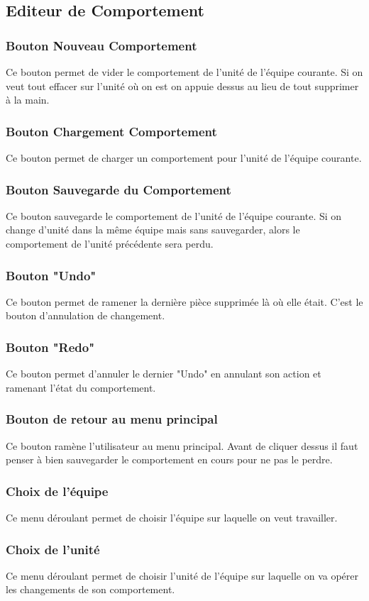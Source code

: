 \documentclass{report}
\begin{document}
\subsection{Editeur de Comportement}
\subsubsection{Bouton Nouveau Comportement}
Ce bouton permet de vider le comportement de l'unité de l'équipe courante. Si on veut tout effacer sur l'unité où on est on appuie dessus au lieu de tout supprimer à la main.
\subsubsection{Bouton Chargement Comportement}
Ce bouton permet de charger un comportement pour l'unité de l'équipe courante.
\subsubsection{Bouton Sauvegarde du Comportement}
Ce bouton sauvegarde le comportement de l'unité de l'équipe courante. Si on change d'unité dans la même équipe mais sans sauvegarder, alors le comportement de l'unité précédente sera perdu.
\subsubsection{Bouton "Undo"}
Ce bouton permet de ramener la dernière pièce supprimée là où elle était. C'est le bouton d'annulation de changement.
\subsubsection{Bouton "Redo"}
Ce bouton permet d'annuler le dernier "Undo" en annulant son action et ramenant l'état du comportement.
\subsubsection{Bouton de retour au menu principal}
Ce bouton ramène l'utilisateur au menu principal. Avant de cliquer dessus il faut penser à bien sauvegarder le comportement en cours pour ne pas le perdre.

\subsubsection{Choix de l'équipe}
Ce menu déroulant permet de choisir l'équipe sur laquelle on veut travailler.
\subsubsection{Choix de l'unité}
Ce menu déroulant permet de choisir l'unité de l'équipe sur laquelle on va opérer les changements de son comportement.
\end{document}
